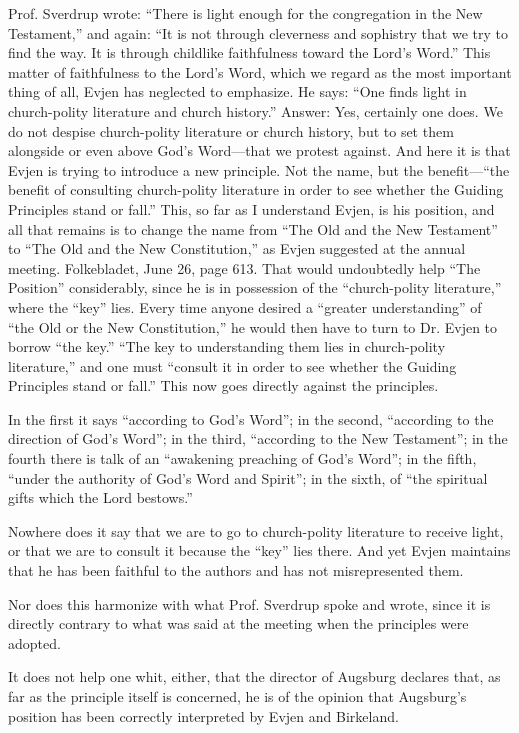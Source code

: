 Prof. Sverdrup wrote: “There is light enough for the congregation in the New Testament,” and again: “It is not through cleverness and sophistry that we try to find the way. It is through childlike faithfulness toward the Lord’s Word.” This matter of faithfulness to the Lord’s Word, which we regard as the most important thing of all, Evjen has neglected to emphasize. He says: “One finds light in church-polity literature and church history.” Answer: Yes, certainly one does. We do not despise church-polity literature or church history, but to set them alongside or even above God’s Word—that we protest against. And here it is that Evjen is trying to introduce a new principle. Not the name, but the benefit—“the benefit of consulting church-polity literature in order to see whether the Guiding Principles stand or fall.” This, so far as I understand Evjen, is his position, and all that remains is to change the name from “The Old and the New Testament” to “The Old and the New Constitution,” as Evjen suggested at the annual meeting. Folkebladet, June 26, page 613. That would undoubtedly help “The Position” considerably, since he is in possession of the “church-polity literature,” where the “key” lies. Every time anyone desired a “greater understanding” of “the Old or the New Constitution,” he would then have to turn to Dr. Evjen to borrow “the key.” “The key to understanding them lies in church-polity literature,” and one must “consult it in order to see whether the Guiding Principles stand or fall.” This now goes directly against the principles.

In the first it says “according to God’s Word”; in the second, “according to the direction of God’s Word”; in the third, “according to the New Testament”; in the fourth there is talk of an “awakening preaching of God’s Word”; in the fifth, “under the authority of God’s Word and Spirit”; in the sixth, of “the spiritual gifts which the Lord bestows.”

Nowhere does it say that we are to go to church-polity literature to receive light, or that we are to consult it because the “key” lies there. And yet Evjen maintains that he has been faithful to the authors and has not misrepresented them.

Nor does this harmonize with what Prof. Sverdrup spoke and wrote, since it is directly contrary to what was said at the meeting when the principles were adopted.

It does not help one whit, either, that the director of Augsburg declares that, as far as the principle itself is concerned, he is of the opinion that Augsburg’s position has been correctly interpreted by Evjen and Birkeland.

